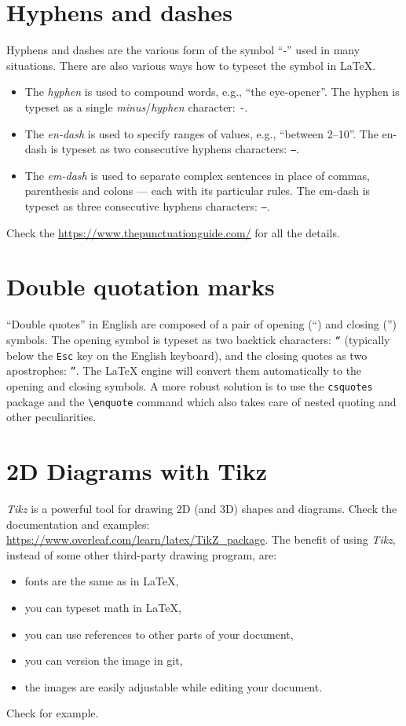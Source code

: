 \section{Hyphens and dashes}

Hyphens and dashes are the various form of the symbol \enquote{-} used in many situations.
There are also various ways how to typeset the symbol in LaTeX.
\begin{itemize}
  \item The \emph{hyphen} is used to compound words, e.g., \enquote{the eye-opener}. The hyphen is typeset as a single \emph{minus}/\emph{hyphen} character: \texttt{-}.
  \item The \emph{en-dash} is used to specify ranges of values, e.g., \enquote{between 2--10}. The en-dash is typeset as two consecutive hyphens characters: \texttt{--}.
  \item The \emph{em-dash} is used to separate complex sentences in place of commas, parenthesis and colons --- each with its particular rules. The em-dash is typeset as three consecutive hyphens characters: \texttt{---}.
\end{itemize}
Check the \url{https://www.thepunctuationguide.com/} for all the details.

\section{Double quotation marks}

\enquote{Double quotes} in English are composed of a pair of opening (``) and closing ('') symbols.
The opening symbol is typeset as two backtick characters: \texttt{``} (typically below the \texttt{Esc} key on the English keyboard), and the closing quotes as two apostrophes: \texttt{''}.
The LaTeX engine will convert them automatically to the opening and closing symbols.
A more robust solution is to use the \texttt{csquotes} package and the \texttt{\textbackslash{}enquote} command which also takes care of nested quoting and other peculiarities.

\section{2D Diagrams with Tikz}

\emph{Tikz} is a powerful tool for drawing 2D (and 3D) shapes and diagrams.
Check the documentation and examples: \url{https://www.overleaf.com/learn/latex/TikZ_package}.
The benefit of using \emph{Tikz}, instead of some other third-party drawing program, are:
\begin{itemize}
  \item fonts are the same as in LaTeX,
  \item you can typeset math in LaTeX,
  \item you can use references to other parts of your document,
  \item you can version the image in git,
  \item the images are easily adjustable while editing your document.
\end{itemize}
Check  for example.

